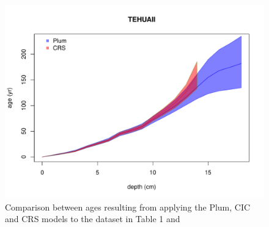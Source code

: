 \documentclass [10pt] {article}
\newcommand{\ac}{\color{red} }  %
\newcommand{\ca}{\color{black}} %
\begin{document}

\begin{figure}[h!]
 \centering
	\includegraphics[width=.75\linewidth]{TEHUAII2.pdf}
	\caption{Comparison between ages resulting from applying the Plum, CIC and CRS  models to the dataset in Table 1 and \citet{Sanchez-Cabeza2012}} 
  \label{fig:tehuaii}
\end{figure}


\end{document}

